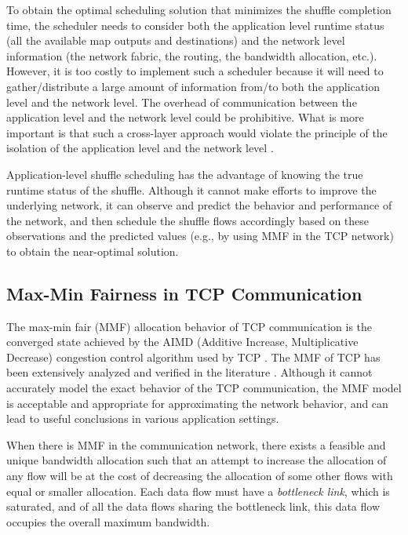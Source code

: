 \documentclass[10pt,journal,compsoc]{IEEEtran}
\begin{document}
To obtain the optimal scheduling solution that minimizes the shuffle
completion time, the scheduler needs to consider both the
application level runtime status (all the available map outputs and
destinations) and the network level information (the network fabric,
the routing, the bandwidth allocation, etc.).
However, it is too costly %
to implement such a scheduler
because it will need to gather/distribute a large amount of information
from/to both the application level and the network level.
The overhead of communication between the application level and the
network level could be prohibitive.
What is more important is that such a cross-layer approach would violate the
principle of the isolation of the application level and the network
level \cite{saltzer1984end}.

Application-level shuffle scheduling has the advantage of knowing
the true runtime status of the shuffle.
Although it cannot make efforts to improve the underlying network, 
it can observe and predict the behavior and performance of the network, 
and then schedule the shuffle flows accordingly based on
these observations and the predicted values (e.g., by using MMF in the TCP
network) to obtain the near-optimal solution. 


\subsection{Max-Min Fairness in TCP Communication}\label{section:MMF}
The max-min fair (MMF) allocation behavior of TCP communication %
is the converged state achieved by the 
AIMD (Additive Increase, Multiplicative Decrease) congestion control
algorithm used by TCP \cite{jacobson1988congestion}.
The MMF of TCP has been extensively
analyzed and verified in the literature \cite{bertsekas1992data, chiu1989analysis, kelly1998rate, vojnovic2000global}.
Although it cannot accurately model the exact behavior of the TCP
communication, the MMF model is acceptable and appropriate for
approximating the network behavior, and can lead to useful conclusions in
various application settings.
 
When there is MMF in the communication network, there
exists a feasible and unique bandwidth allocation
such that an attempt to increase the allocation of any flow will be
at the cost of decreasing the allocation of some other
flows with equal or smaller allocation.
Each data flow must have a \emph{bottleneck link}, which is saturated, 
and of all the data flows sharing the bottleneck link, this data flow
occupies the overall maximum bandwidth.
\end{document}
